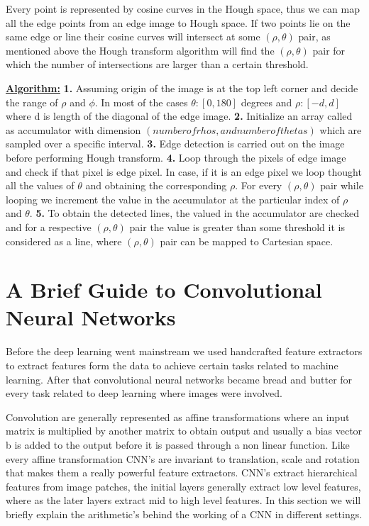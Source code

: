     Every point is represented by cosine curves in the Hough space, thus we can map all the edge points from an edge image to Hough space. If two points lie on the same edge or line their cosine curves will intersect at some $(\rho,\theta)$ pair, as mentioned above the Hough transform algorithm will find the $(\rho,\theta)$ pair for which the number of intersections are larger than a certain threshold. \newline 
    
    
    \underline{\textbf{Algorithm:}} \newline
    \textbf{1.} Assuming origin of the image is at the top left corner and decide the range of $\rho$ and $\phi$. In most of the cases $\theta:[0, 180]$ degrees and $\rho:[-d,d]$ where d is length of the diagonal of the edge image. \newline
    \textbf{2.} Initialize an array called as accumulator with dimension $(number of rhos, and number of thetas)$ which are sampled over a specific interval. \newline
    \textbf{3.} Edge detection is carried out on the image before performing Hough transform.\newline 
    \textbf{4.} Loop through the pixels of edge image and check if that pixel is edge pixel. In case, if it is an edge pixel we loop thought all the values of $\theta$ and obtaining the corresponding $\rho$. For every $(\rho, \theta)$ pair while looping we increment the value in the accumulator at the particular index of $\rho$ and $\theta$. \newline
    \textbf{5.} To obtain the detected lines, the valued in the accumulator are checked and for a respective $(\rho,\theta)$ pair the value is greater than some threshold it is considered as a line, where $(\rho,\theta)$ pair can be mapped to Cartesian space.  
    
    \section{A Brief Guide to Convolutional Neural Networks}
    Before the deep learning went mainstream we used handcrafted feature extractors to extract features form the data to achieve certain tasks related to machine learning.
    After that convolutional neural networks became bread and butter for every task related to deep learning where images were involved. 
    
    Convolution are generally represented as affine transformations where an input matrix is multiplied by another matrix to obtain output and usually a bias vector b is added to the output before it is passed through a non linear function. Like every affine transformation CNN's are invariant to translation, scale and rotation that makes them a really powerful feature extractors. CNN's extract hierarchical features from image patches, the initial layers generally extract low level features, where as the later layers extract mid to high level features. In this section we will briefly explain the arithmetic's behind the working of a CNN in different settings. 
    
